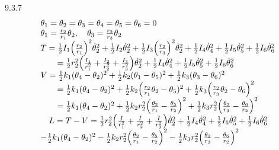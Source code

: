 \begin{problem}{9.3.7}
\[
\begin{array}{r l} & {\theta_ {1} = \theta_ {2} = \theta_ {3} = \theta_ {4} = \theta_ {5} = \theta_ {6} = 0} \\ & {\theta_ {1} = \frac {r _ {2}}{r _ {1}} \theta_ {2}, \quad \theta_ {3} = \frac {r _ {2}}{r _ {3}} \theta_ {2}} \\ & {T = \frac {1}{2} I _ {1} \Big (\frac {r _ {2}}{r _ {1}} \Big) ^ {2} \dot {\theta} _ {2} ^ {2} + \frac {1}{2} I _ {2} \dot {\theta} _ {2} ^ {2} + \frac {1}{2} I _ {3} \Big (\frac {r _ {2}}{r _ {3}} \Big) ^ {2} \dot {\theta} _ {2} ^ {2} + \frac {1}{2} I _ {4} \dot {\theta} _ {4} ^ {2} + \frac {1}{2} I _ {5} \dot {\theta} _ {5} ^ {2} + \frac {1}{2} I _ {6} \dot {\theta} _ {6} ^ {2}} \\ & {\qquad = \frac {1}{2} r _ {2} ^ {2} \Big (\frac {I _ {1}}{r _ {1} ^ {2}} + \frac {I _ {2}}{r _ {2} ^ {2}} + \frac {I _ {3}}{r _ {3} ^ {2}} \Big) \dot {\theta} _ {2} ^ {2} + \frac {1}{2} I _ {4} \dot {\theta} _ {4} ^ {2} + \frac {1}{2} I _ {5} \dot {\theta} _ {5} ^ {2} + \frac {1}{2} I _ {6} \dot {\theta} _ {6} ^ {2}} \\ & {V = \frac {1}{2} k _ {1} (\theta_ {4} - \theta_ {2}) ^ {2} + \frac {1}{2} k _ {2} (\theta_ {1} - \theta_ {5}) ^ {2} + \frac {1}{2} k _ {3} (\theta_ {3} - \theta_ {6}) ^ {2}} \\ & {\qquad = \frac {1}{2} k _ {1} (\theta_ {4} - \theta_ {2}) ^ {2} + \frac {1}{2} k _ {2} \Big (\frac {r _ {2}}{r _ {1}} \theta_ {2} - \theta_ {5}) ^ {2} + \frac {1}{2} k _ {3} \Big (\frac {r _ {2}}{r _ {3}} \theta_ {2} - \theta_ {6} \Big) ^ {2}} \\ & {\qquad = \frac {1}{2} k _ {1} (\theta_ {4} - \theta_ {2}) ^ {2} + \frac {1}{2} k _ {2} r _ {2} ^ {2} \Big (\frac {\theta_ {2}}{r _ {1}} - \frac {\theta_ {5}}{r _ {2}} \Big) ^ {2} + \frac {1}{2} k _ {3} r _ {2} ^ {2} \Big (\frac {\theta_ {2}}{r _ {3}} - \frac {\theta_ {6}}{r _ {2}} \Big) ^ {2}} \\ & {\quad L = T - V = \frac 12 r _ {2} ^ {2} \Big (\frac I{r _ {1} ^ {2}} + \frac I{r _ {2} ^ {2}} + \frac I{r _ {3} ^ {2}} \Big) \dot {\theta} _ {2} ^ {2} + \frac 12 I _ {4} \dot {\theta} _ {4} ^ {2} + \frac 12 I _ {5} \dot {\theta} _ {5} ^ {2} + \frac 12 I _ {6} \dot {\theta} _ {6} ^ {2}} \\ & {-   \frac 12 k _ {1} (\theta_ {4} - \theta_ {2}) ^ {2} -   \frac 12 k _ {2} r _ {2} ^ {2}   \Big (\frac {\theta_ {2}}{r _ {1}} - \frac {\theta_ {5}}{r _ {2}}   \Big) ^ {2} -   \frac 12 k _ {3} r _ {2} ^ {2}   \Big (\frac {\theta_ {2}}{r _ {3}} - \frac {\theta_ {6}}{r _ {2}}   \Big) ^ {2}} \end{array}
\]
\begin{center}

\end{center}
\end{problem}
\clearpage


